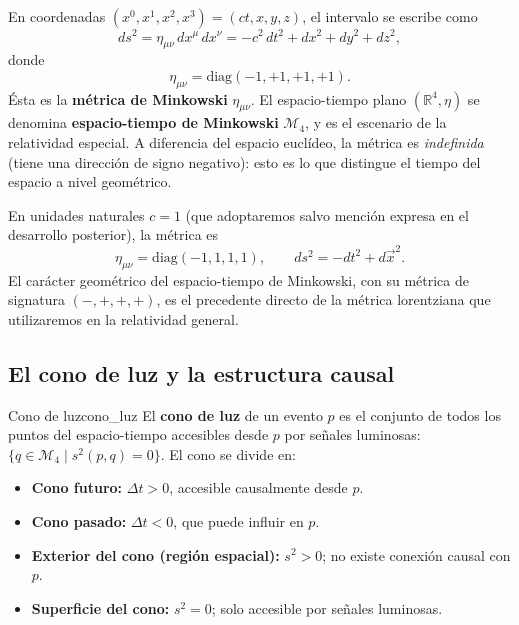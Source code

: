 En coordenadas $(x^0, x^1, x^2, x^3) = (ct, x, y, z)$, el intervalo se escribe como
\begin{equation}
  ds^2 = \eta_{\mu\nu}\, dx^\mu\, dx^\nu
  = -c^2\,dt^2 + dx^2 + dy^2 + dz^2,
  \label{eq:minkowski_metric}
\end{equation}
donde
\begin{equation}
  \eta_{\mu\nu} = \mathrm{diag}(-1,+1,+1,+1).
  \label{eq:eta}
\end{equation}
Ésta es la \textbf{métrica de Minkowski} $\eta_{\mu\nu}$. El espacio-tiempo plano $(\mathbb{R}^4, \eta)$ se denomina \textbf{espacio-tiempo de Minkowski} $\mathcal{M}_4$, y es el escenario de la relatividad especial. A diferencia del espacio euclídeo, la métrica es \emph{indefinida} (tiene una dirección de signo negativo): esto es lo que distingue el tiempo del espacio a nivel geométrico.

\begin{importante}
En unidades naturales $c = 1$ (que adoptaremos salvo mención expresa en el desarrollo posterior), la métrica es
\[
  \eta_{\mu\nu} = \mathrm{diag}(-1,1,1,1),
  \qquad ds^2 = -dt^2 + d\vec{x}^2.
\]
El carácter geométrico del espacio-tiempo de Minkowski, con su métrica de signatura $(-,+,+,+)$, es el precedente directo de la métrica lorentziana que utilizaremos en la relatividad general.
\end{importante}

\subsection{El cono de luz y la estructura causal}

\begin{definicion}{Cono de luz}{cono_luz}
El \textbf{cono de luz} de un evento $p$ es el conjunto de todos los puntos del espacio-tiempo accesibles desde $p$ por señales luminosas: $\{q \in \mathcal{M}_4 \mid s^2(p,q) = 0\}$. El cono se divide en:
\begin{itemize}[leftmargin=2em]
  \item \textbf{Cono futuro:} $\Delta t > 0$, accesible causalmente desde $p$.
  \item \textbf{Cono pasado:} $\Delta t < 0$, que puede influir en $p$.
  \item \textbf{Exterior del cono (región espacial):} $s^2 > 0$; no existe conexión causal con $p$.
  \item \textbf{Superficie del cono:} $s^2 = 0$; solo accesible por señales luminosas.
\end{itemize}
\end{definicion}

